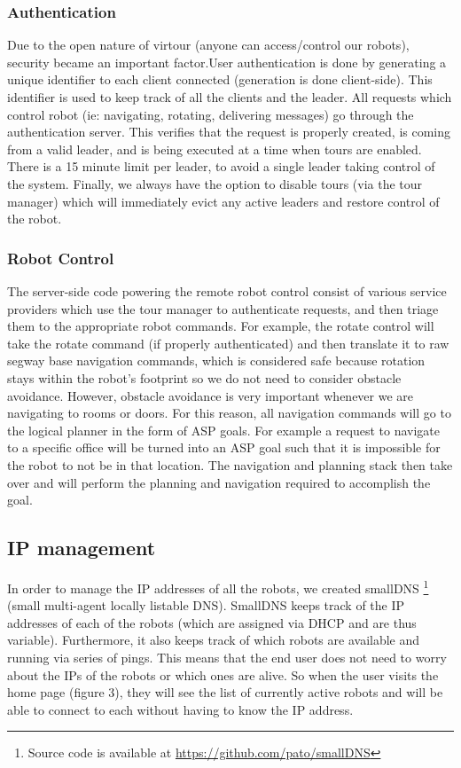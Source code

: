 \documentclass[
  oneside,
  11pt, a4paper,
  footinclude=true,
  headinclude=true,
  cleardoublepage=empty
]{article}
\begin{document}
\subsubsection{Authentication}

Due to the open nature of virtour (anyone can access/control our robots),
security became an important factor.User authentication is done by generating a
unique identifier to each client connected (generation is done client-side).
This identifier is used to keep track of all the clients and the leader. All
requests which control robot (ie: navigating, rotating, delivering messages) go
through the authentication server. This verifies that the request is properly
created, is coming from a valid leader, and is being executed at a time when
tours are enabled. There is a 15 minute limit per leader, to avoid
a single leader taking control of the system. Finally, we always have the
option to disable tours (via the tour manager) which will immediately evict any
active leaders and restore control of the robot.

\subsubsection{Robot Control}

The server-side code powering the remote robot control consist of various
service providers which use the tour manager to authenticate requests, and then
triage them to the appropriate robot commands. For example, the rotate control
will take the rotate command (if properly authenticated) and then translate it
to raw segway base navigation commands, which is considered safe because
rotation stays within the robot's footprint so we do not need to consider
obstacle avoidance. However, obstacle avoidance is very important whenever we
are navigating to rooms or doors. For this reason, all navigation commands will
go to the logical planner in the form of ASP goals. For example a request to
navigate to a specific office will be turned into an ASP goal such that it is
impossible for the robot to not be in that location. The navigation and
planning stack then take over and will perform the planning and navigation
required to accomplish the goal.

\subsection{IP management}

In order to manage the IP addresses of all the robots, we created smallDNS
\footnote{Source code is available at \url{https://github.com/pato/smallDNS}}
(small multi-agent locally listable DNS). SmallDNS keeps track of the IP
addresses of each of the robots (which are assigned via DHCP and are thus
variable). Furthermore, it also keeps track of which robots are available and
running via series of pings. This means that the end user does not need to
worry about the IPs of the robots or which ones are alive. So when the user
visits the home page (figure 3), they will see the list of currently active
robots and will be able to connect to each without having to know the IP
address.
\end{document}
